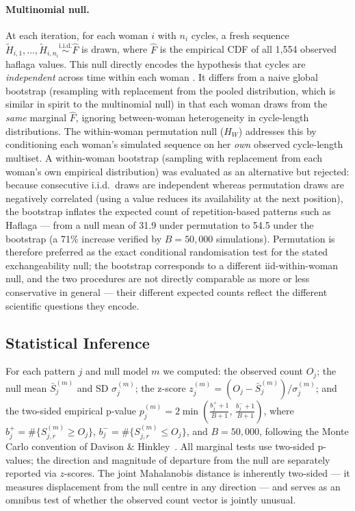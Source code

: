 \documentclass[12pt]{article}
\begin{document}
\paragraph{Multinomial null.}
At each iteration, for each woman $i$ with $n_i$ cycles, a fresh sequence
$\tilde{H}_{i,1}, \ldots, \tilde{H}_{i,n_i} \overset{\text{i.i.d.}}{\sim} \hat{F}$
is drawn, where $\hat{F}$ is the empirical CDF of all 1,554 observed haflaga values.
This null directly encodes the hypothesis that cycles are \textit{independent} across
time within each woman \cite{anon2022phd}. It differs from a naive global bootstrap
(resampling with replacement from the pooled distribution, which is similar in spirit
to the multinomial null) in that each woman draws from the \emph{same} marginal $\hat{F}$,
ignoring between-woman heterogeneity in cycle-length distributions. The within-woman
permutation null ($H_W$) addresses this by conditioning each woman's simulated sequence
on her \emph{own} observed cycle-length multiset. A within-woman bootstrap (sampling
with replacement from each woman's own empirical distribution) was evaluated as an
alternative but rejected: because consecutive i.i.d.\ draws are independent whereas
permutation draws are negatively correlated (using a value reduces its availability at
the next position), the bootstrap inflates the expected count of repetition-based
patterns such as Haflaga --- from a null mean of 31.9 under permutation to 54.5 under
the bootstrap (a 71\% increase verified by $B = 50{,}000$ simulations). Permutation is
therefore preferred as the exact conditional randomisation test for the stated
exchangeability null; the bootstrap corresponds to a different iid-within-woman null,
and the two procedures are not directly comparable as more or less conservative in
general --- their different expected counts reflect the different scientific questions
they encode.

\subsection{Statistical Inference}
\label{sec:inference}

For each pattern $j$ and null model $m$ we computed: the observed count $O_j$; the
null mean $\bar{S}_j^{(m)}$ and SD $\sigma_j^{(m)}$; the z-score $z_j^{(m)} =
(O_j - \bar{S}_j^{(m)}) / \sigma_j^{(m)}$; and the two-sided empirical p-value
$p_j^{(m)} = 2\min\!\left(\tfrac{b_j^++1}{B+1},\,\tfrac{b_j^-+1}{B+1}\right)$,
where $b_j^+ = \#\{S_{j,r}^{(m)} \geq O_j\}$, $b_j^- = \#\{S_{j,r}^{(m)} \leq O_j\}$,
and $B = 50{,}000$, following the Monte Carlo convention of Davison \& Hinkley~\cite{davison1997}.
All marginal tests use two-sided p-values; the direction and magnitude of departure
from the null are separately reported via $z$-scores. The joint Mahalanobis distance
is inherently two-sided --- it measures displacement from the null centre in any
direction --- and serves as an omnibus test of whether the observed count vector is
jointly unusual.
\end{document}
